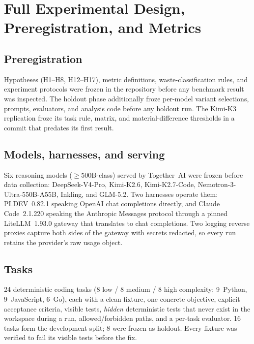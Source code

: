 \documentclass[11pt]{article}
\newcommand{\pidev}{PI.DEV}
\newcommand{\cc}{Claude Code}
\begin{document}
\appendix

\section{Full Experimental Design, Preregistration, and Metrics}
\label{app:design}

\subsection{Preregistration}
Hypotheses (H1--H8, H12--H17), metric definitions, waste-classification
rules, and experiment protocols were frozen in the repository before any
benchmark result was inspected. The holdout phase additionally froze
per-model variant selections, prompts, evaluators, and analysis code
before any holdout run. The Kimi-K3 replication froze its task rule,
matrix, and material-difference thresholds in a commit that predates its
first result.

\subsection{Models, harnesses, and serving}
Six reasoning models ($\geq$500B-class) served by Together~AI were frozen
before data collection: DeepSeek-V4-Pro, Kimi-K2.6, Kimi-K2.7-Code,
Nemotron-3-Ultra-550B-A55B, Inkling, and GLM-5.2. Two harnesses operate
them: \pidev{}~0.82.1 speaking OpenAI chat completions directly, and
\cc{}~2.1.220 speaking the Anthropic Messages protocol through a pinned
LiteLLM~1.93.0 gateway that translates to chat completions. Two logging
reverse proxies capture both sides of the gateway with secrets redacted,
so every run retains the provider's raw usage object.

\subsection{Tasks}
24 deterministic coding tasks (8 low / 8 medium / 8 high complexity;
9~Python, 9~JavaScript, 6~Go), each with a clean fixture, one concrete
objective, explicit acceptance criteria, visible tests, \emph{hidden}
deterministic tests that never exist in the workspace during a run,
allowed/forbidden paths, and a per-task evaluator. 16 tasks form the
development split; 8 were frozen as holdout. Every fixture was verified to
fail its visible tests before the fix.
\end{document}
